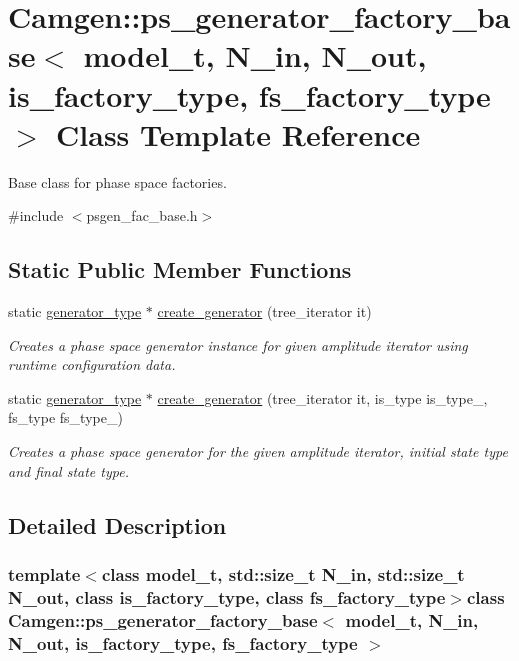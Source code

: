 \hypertarget{a00453}{}\section{Camgen\+:\+:ps\+\_\+generator\+\_\+factory\+\_\+base$<$ model\+\_\+t, N\+\_\+in, N\+\_\+out, is\+\_\+factory\+\_\+type, fs\+\_\+factory\+\_\+type $>$ Class Template Reference}
\label{a00453}


Base class for phase space factories.  




{\ttfamily \#include $<$psgen\+\_\+fac\+\_\+base.\+h$>$}

\subsection*{Static Public Member Functions}
\begin{DoxyCompactItemize}
\item 
static \hyperlink{a00450}{generator\+\_\+type} $\ast$ \hyperlink{a00453_afbb1ad50d21e56067a9e1b777d4a3ddd}{create\+\_\+generator} (tree\+\_\+iterator it)
\begin{DoxyCompactList}\small\item\em Creates a phase space generator instance for given amplitude iterator using runtime configuration data. \end{DoxyCompactList}\item 
static \hyperlink{a00450}{generator\+\_\+type} $\ast$ \hyperlink{a00453_a7321000aa0cc49bc07297e57672aa4c7}{create\+\_\+generator} (tree\+\_\+iterator it, is\+\_\+type is\+\_\+type\+\_\+, fs\+\_\+type fs\+\_\+type\+\_\+)
\begin{DoxyCompactList}\small\item\em Creates a phase space generator for the given amplitude iterator, initial state type and final state type. \end{DoxyCompactList}\end{DoxyCompactItemize}


\subsection{Detailed Description}
\subsubsection*{template$<$class model\+\_\+t, std\+::size\+\_\+t N\+\_\+in, std\+::size\+\_\+t N\+\_\+out, class is\+\_\+factory\+\_\+type, class fs\+\_\+factory\+\_\+type$>$class Camgen\+::ps\+\_\+generator\+\_\+factory\+\_\+base$<$ model\+\_\+t, N\+\_\+in, N\+\_\+out, is\+\_\+factory\+\_\+type, fs\+\_\+factory\+\_\+type $>$}

